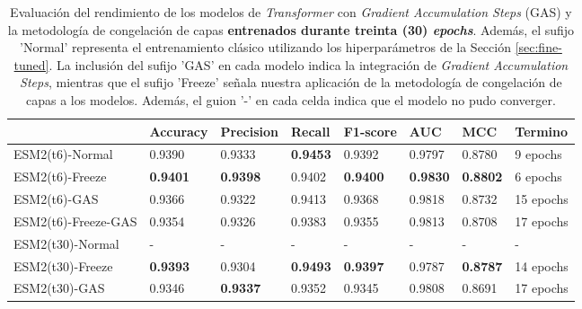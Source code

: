 \begin{table}[]
	\centering
	\caption[Comparación de los modelos \textit{Transformer} entrenados por 30 \textit{epochs}.]{
		Evaluación del rendimiento de los modelos de \textit{Transformer} con \textit{Gradient Accumulation Steps} (GAS) y la metodología de congelación de capas \textbf{entrenados durante treinta (30) \textit{epochs}}. Además, el sufijo 'Normal' representa el entrenamiento clásico utilizando los hiperparámetros de la Sección \ref{sec:fine-tuned}. La inclusión del sufijo 'GAS' en cada modelo indica la integración de \textit{Gradient Accumulation Steps}, mientras que el sufijo 'Freeze' señala nuestra aplicación de la metodología de congelación de capas a los modelos. Además, el guion '-' en cada celda indica que el modelo no pudo converger.}
	\label{tab:comparison}
	\scriptsize
	\setlength{\tabcolsep}{0.5em} %
	{\renewcommand{\arraystretch}{1.5}%
	\begin{tabular}{llllllll} 
		\textbf{}            & \textbf{Accuracy} & \textbf{Precision} & \textbf{Recall} & \textbf{F1-score} & \textbf{AUC}    & \textbf{MCC}    & \textbf{Termino} \\ \midrule
		ESM2(t6)-Normal             & 0.9390            & 0.9333             & \textbf{0.9453} & 0.9392            & 0.9797          & 0.8780          & 9 epochs            \\
		ESM2(t6)-Freeze      & \textbf{0.9401}   & \textbf{0.9398}    & 0.9402          & \textbf{0.9400}   & \textbf{0.9830} & \textbf{0.8802} & 6 epochs            \\
		ESM2(t6)-GAS         & 0.9366            & 0.9322             & 0.9413          & 0.9368            & 0.9818          & 0.8732          & 15 epochs           \\
		ESM2(t6)-Freeze-GAS  & 0.9354            & 0.9326             & 0.9383          & 0.9355            & 0.9813          & 0.8708          & 17 epochs           \\ \midrule
		ESM2(t30)-Normal            & -                 & -                  & -               & -                 & -               & -               & -                   \\
		ESM2(t30)-Freeze     & \textbf{0.9393}   & 0.9304             & \textbf{0.9493} & \textbf{0.9397}   & 0.9787          & \textbf{0.8787} & 14 epochs           \\
		ESM2(t30)-GAS        & 0.9346            & \textbf{0.9337}    & 0.9352          & 0.9345            & 0.9808          & 0.8691          & 17 epochs           \\

\end{tabular}}
\end{table}
